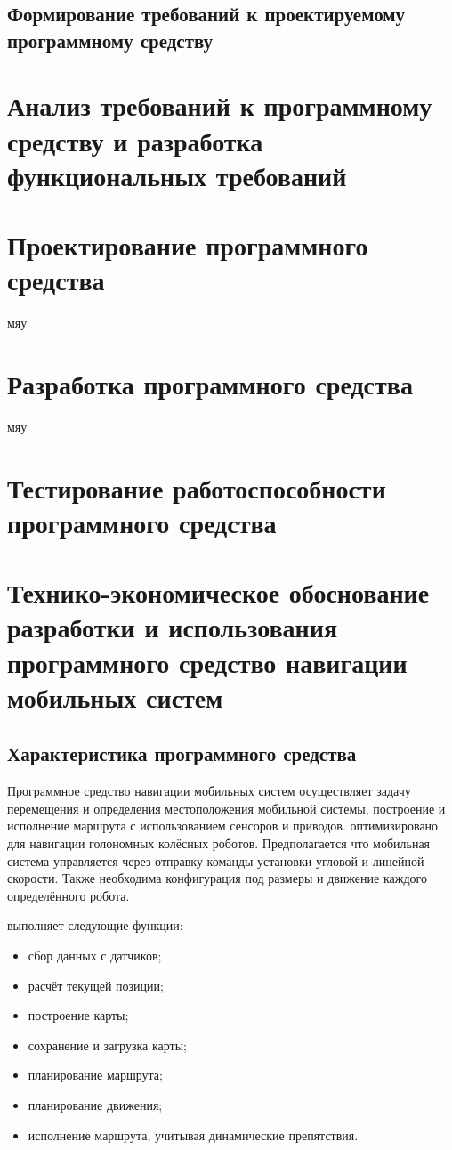 	\subsection{Формирование требований к проектируемому программному средству}
	\section{Анализ требований к программному средству и разработка функциональных
	требований}

	\section{Проектирование программного средства}
мяу

	\section{Разработка программного средства}
мяу
	\section{Тестирование работоспособности программного средства}

	\section{Технико-экономическое обоснование разработки и использования
	программного средство навигации мобильных систем}

\subsection{Характеристика программного средства}
Программное средство навигации мобильных систем осуществляет задачу перемещения
и определения местоположения мобильной системы, построение и исполнение 
маршрута с использованием сенсоров и приводов. \appname{} оптимизировано для
навигации голономных колёсных роботов. Предполагается что мобильная система 
управляется через отправку команды установки угловой и линейной скорости. 
Также необходима конфигурация под размеры и движение каждого определённого
робота.

\appname{} выполняет следующие функции:

\begin{itemize}
	\item сбор данных с датчиков;
	\item расчёт текущей позиции;
	\item построение карты;
	\item сохранение и загрузка карты;
	\item планирование маршрута;
	\item планирование движения;
	\item исполнение маршрута, учитывая динамические препятствия.
\end{itemize}


